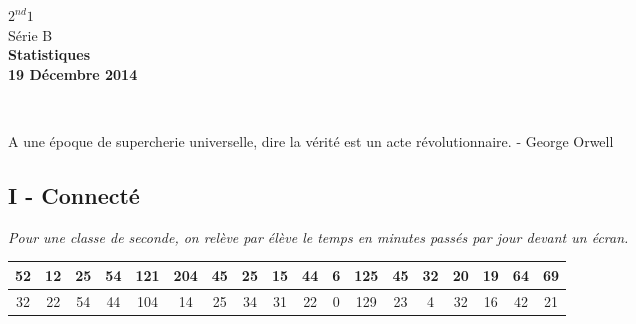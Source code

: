 \documentclass[11pt]{article}
\begin{document}

\begin{minipage}[t]{\textwidth}
  \raggedright
      {\bfseries $2^{nd}1$}\\[.35ex]
      Série B\\
      \vspace*{-1cm}
      \raggedleft
          {\bfseries Statistiques}\\[.35ex]
          {\bfseries 19 Décembre 2014}\\[.35ex]
\end{minipage}\\[1em]

\begin{center}
  \textsf{A une époque de supercherie universelle, dire la vérité est un acte révolutionnaire. - George Orwell}
\end{center}

\setlength{\columnseprule}{1pt}

\subsection*{I - Connecté}

\textit{Pour une classe de seconde, on relève par élève le temps en minutes passés par jour devant un écran.}

\begin{center}
  \begin{tabular}{| c | c | c | c | c | c | c | c | c | c | c | c | c | c | c | c | c | c | }
    \hline
    52 & 12 & 25 & 54 & 121 & 204 & 45 & 25 & 15 & 44 & 6 & 125 & 45 & 32 & 20 & 19 & 64 & 69 \\
    \hline
    32 & 22 & 54 & 44 & 104 & 14  & 25 & 34 & 31 & 22 & 0 & 129 & 23 &  4 & 32 & 16 & 42 & 21 \\
    \hline
  \end{tabular}
\end{center}
\end{document}
